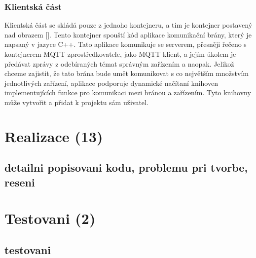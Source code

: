 \subsection{Klientská část}

Klientská část se skládá pouze z jednoho kontejneru, a tím je kontejner postavený nad obrazem []. Tento kontejner spouští kód aplikace komunikační brány, který je napsaný v jazyce C++. Tato aplikace komunikuje se serverem, přesněji řečeno s kontejnerem MQTT zprostředkovatele, jako MQTT klient, a jejím úkolem je předávat zprávy z odebíraných témat správným zařízením a naopak. Jelikož chceme zajistit, že tato brána bude umět komunikovat s co největším množstvím jednotlivých zařízení, aplikace podporuje dynamické načítaní knihoven implementujících funkce pro komunikaci mezi bránou a zařízením. Tyto knihovny může vytvořit a přidat k projektu sám uživatel.


\section{}

\chapter{Realizace (13)}

\section{detailni popisovani kodu, problemu pri tvorbe, reseni}

\chapter{Testovani (2)}

\section{testovani}
